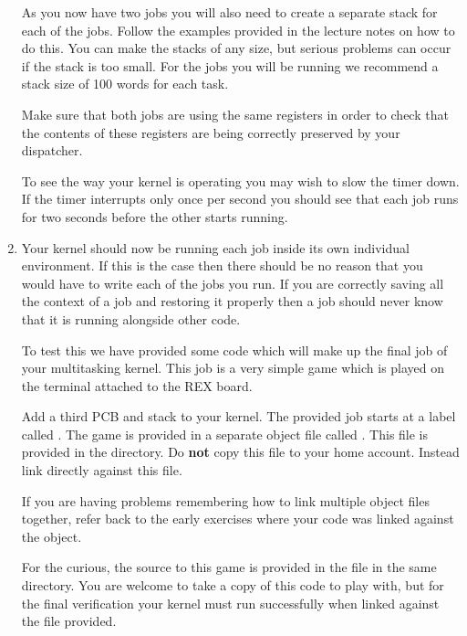 \documentclass[a4paper,10pt]{article}
\begin{document}
\begin{enumerate}
As you now have two jobs you will also need to create a separate stack
for each of the jobs. Follow the examples provided in the lecture
notes on how to do this. You can make the stacks of any size, but
serious problems can occur if the stack is too small. For the jobs you
will be running we recommend a stack size of 100 words for each task.

Make sure that both jobs are using the same registers in order to
check that the contents of these registers are being correctly
preserved by your dispatcher.

To see the way your kernel is operating you may wish to slow the
timer down. If the timer interrupts only once per second you should
see that each job runs for two seconds before the other starts
running.

\item
\label{ques:final}

Your kernel should now be running each job inside its own individual
environment. If this is the case then there should be no reason that
you would have to write each of the jobs you run. If you are correctly
saving all the context of a job and restoring it properly then a job
should never know that it is running alongside other code.

To test this we have provided some code which will make up the final
job of your multitasking kernel. This job is a very simple game which
is played on the terminal attached to the REX board.

Add a third PCB and stack to your kernel. The provided job starts at a
label called . The game is provided in a separate
object file called . This file is provided in the
 directory. Do \textbf{not} copy this file to
your home account. Instead link directly against this file.

If you are having problems remembering how to link multiple object
files together, refer back to the early exercises where your code was
linked against the  object.

For the curious, the source to this game is provided in the
 file in the same directory. You are welcome to take a
copy of this code to play with, but for the final verification your
kernel must run successfully when linked against the 
file provided.

\end{enumerate}
\thispagestyle{rcsfooters}
\pagestyle{rcsfooters}
\end{document}
